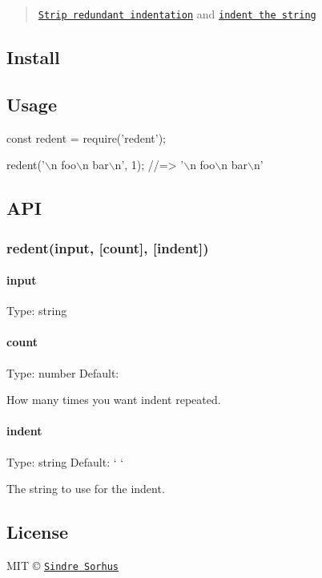 \begin{quote}
\href{https://github.com/sindresorhus/strip-indent}{\tt Strip redundant indentation} and \href{https://github.com/sindresorhus/indent-string}{\tt indent the string} \end{quote}


\subsection*{Install}




\subsection*{Usage}


\begin{DoxyCode}
const redent = require('redent');

redent('\(\backslash\)n  foo\(\backslash\)n    bar\(\backslash\)n', 1);
//=> '\(\backslash\)n foo\(\backslash\)n   bar\(\backslash\)n'
\end{DoxyCode}


\subsection*{A\+PI}

\subsubsection*{redent(input, \mbox{[}count\mbox{]}, \mbox{[}indent\mbox{]})}

\paragraph*{input}

Type\+: {\ttfamily string}

\paragraph*{count}

Type\+: {\ttfamily number} Default\+: {}

How many times you want {\ttfamily indent} repeated.

\paragraph*{indent}

Type\+: {\ttfamily string} Default\+: `\textquotesingle{} \textquotesingle{}`

The string to use for the indent.

\subsection*{License}

M\+IT © \href{http://sindresorhus.com}{\tt Sindre Sorhus} 